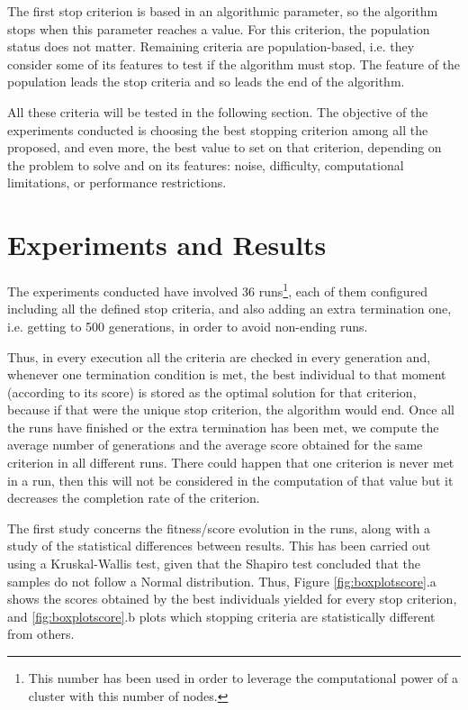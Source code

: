 \documentclass[runningheads,a4paper]{llncs}
\begin{document}
The first stop criterion is based in an algorithmic parameter, so the algorithm stops when this parameter reaches a value. For this criterion, the population status does not matter. Remaining criteria are population-based, i.e. they consider some of its features to test if the algorithm must stop. The feature of the population leads the stop criteria and so leads the end of the algorithm. 

All these criteria will be tested in the following section. The objective of the experiments conducted is choosing the best stopping criterion among all the proposed, and even more, the best value to set on that criterion, depending on the problem to solve and on its features: noise, difficulty, computational limitations, or performance restrictions.


%
%
\section{Experiments and Results}
\label{sec:res}

The experiments conducted have involved 36 runs\footnote{This number has been used in order to leverage the computational power of a cluster with this number of nodes.}, each of them configured including all the defined stop criteria, and also adding an extra termination one, i.e. getting to 500 generations, in order to avoid non-ending runs.

Thus, in every execution all the criteria are checked in every generation and, whenever one termination condition is met, the best individual to that moment (according to its score) is stored as the optimal solution for that criterion, because if that were the unique stop criterion, the algorithm would end.
Once all the runs have finished or the extra termination has been met, we compute the average number of generations and the average score obtained for the same criterion in all different runs. There could happen that one criterion is never met in a run, then this will not be considered in the computation of that value but it decreases the completion rate of the criterion. 

The first study concerns the fitness/score evolution in the runs, along with a study of the statistical differences between results. This has been carried out using a Kruskal-Wallis test, given that the Shapiro test concluded that the samples do not follow a Normal distribution. Thus, Figure \ref{fig:boxplotscore}.a shows the scores obtained by the best individuals yielded for every stop criterion, and \ref{fig:boxplotscore}.b plots which stopping criteria are statistically different from others.
\end{document}
